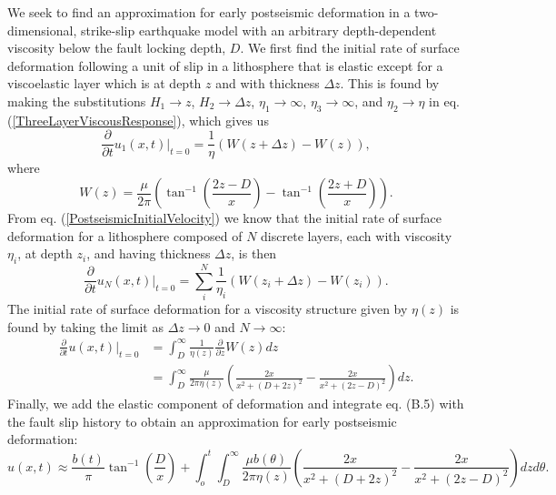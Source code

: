 We seek to find an approximation for early postseismic deformation in
a two-dimensional, strike-slip earthquake model with an arbitrary
depth-dependent viscosity below the fault locking depth, $D$.  We
first find the initial rate of surface deformation following a unit of
slip in a lithosphere that is elastic except for a viscoelastic layer
which is at depth $z$ and with thickness $\Delta z$. This is found by
making the substitutions $H_1 \to z$, $H_2 \to \Delta z$, $\eta_1 \to
\infty$, $\eta_3 \to \infty$, and $\eta_2 \to \eta$ in
eq. (\ref{ThreeLayerViscousResponse}), which gives us
\begin{equation}
  \frac{\partial}{\partial t}u_1(x,t)\big|_{t=0} = 
  \frac{1}{\eta}(W(z+\Delta z) - W(z)),
\end{equation}
where
\begin{equation}
  W(z) = \frac{\mu}{2\pi}\left(\tan^{-1}\left(\frac{2z-D}{x}\right) -
  \tan^{-1}\left(\frac{2z+D}{x}\right)\right).
\end{equation}
From eq. (\ref{PostseismicInitialVelocity}) we know that the initial
rate of surface deformation for a lithosphere composed of $N$ discrete
layers, each with viscosity $\eta_i$, at depth $z_i$, and having
thickness $\Delta z$, is then
\begin{equation}
  \frac{\partial}{\partial t}u_N(x,t)\big|_{t=0} = \sum_i^N
  \frac{1}{\eta_i}(W(z_i + \Delta z) - W(z_i)).
\end{equation}
The initial rate of surface deformation for a viscosity structure
given by $\eta(z)$ is found by taking the limit as $\Delta z \to 0$
and $N \to \infty$:
\begin{align}\label{ArbitraryViscousResponse}
 \frac{\partial}{\partial t}u(x,t)\big|_{t=0} &= \int_D^\infty
 \frac{1}{\eta(z)}\frac{\partial}{\partial z} W(z) dz\\
 &= \int_D^{\infty}\frac{\mu}{2\pi\eta(z)}\left(\frac{2x}{x^2 + \left(D + 2z\right)^2} -
                     \frac{2x}{x^2 + \left(2z - D\right)^2}\right) dz.
\end{align}
Finally, we add the elastic component of deformation and integrate
eq. (B.5) with the fault slip history to obtain
an approximation for early postseismic deformation:
\begin{equation}
u(x,t) \approx \frac{b(t)}{\pi}\tan^{-1}(\frac{D}{x}) + 
               \int_o^t\int_D^\infty \frac{\mu b(\theta)}{2\pi\eta(z)}
                                    \left(\frac{2x}{x^2 + \left(D + 2z\right)^2} - 
                                    \frac{2x}{x^2 + \left(2z - D\right)^2}\right)
                                    dz d\theta.
\end{equation}
